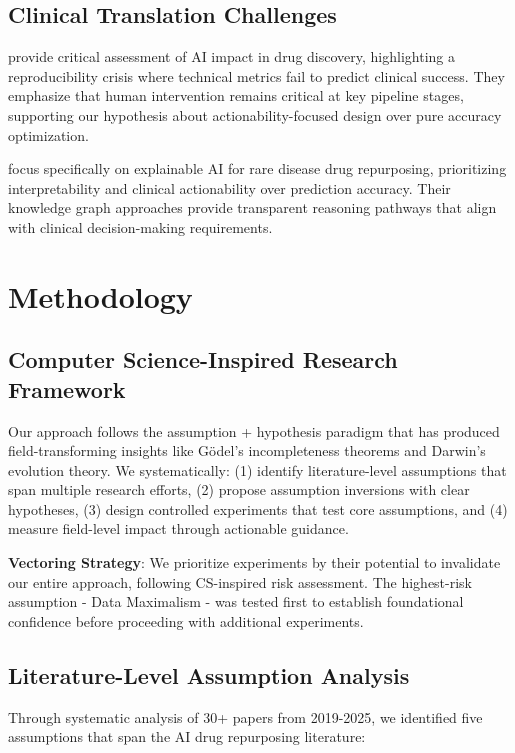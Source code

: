 \documentclass{article}
\begin{document}
\subsection{Clinical Translation Challenges}

\citet{hasselgren_oprea_2023} provide critical assessment of AI impact in drug discovery, highlighting a reproducibility crisis where technical metrics fail to predict clinical success. They emphasize that human intervention remains critical at key pipeline stages, supporting our hypothesis about actionability-focused design over pure accuracy optimization.

\citet{kg_explainable_rare_2024} focus specifically on explainable AI for rare disease drug repurposing, prioritizing interpretability and clinical actionability over prediction accuracy. Their knowledge graph approaches provide transparent reasoning pathways that align with clinical decision-making requirements.

\section{Methodology}

\subsection{Computer Science-Inspired Research Framework}

Our approach follows the assumption + hypothesis paradigm that has produced field-transforming insights like Gödel's incompleteness theorems and Darwin's evolution theory. We systematically: (1) identify literature-level assumptions that span multiple research efforts, (2) propose assumption inversions with clear hypotheses, (3) design controlled experiments that test core assumptions, and (4) measure field-level impact through actionable guidance.

\textbf{Vectoring Strategy}: We prioritize experiments by their potential to invalidate our entire approach, following CS-inspired risk assessment. The highest-risk assumption - Data Maximalism - was tested first to establish foundational confidence before proceeding with additional experiments.

\subsection{Literature-Level Assumption Analysis}

Through systematic analysis of 30+ papers from 2019-2025, we identified five assumptions that span the AI drug repurposing literature:
\end{document}
